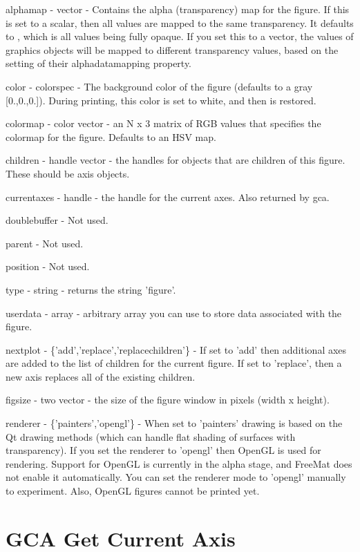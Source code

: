 \begin{DoxyItemize}
\item {\ttfamily alphamap} -\/ {\ttfamily vector} -\/ Contains the alpha (transparency) map for the figure. If this is set to a scalar, then all values are mapped to the same transparency. It defaults to {}, which is all values being fully opaque. If you set this to a vector, the values of graphics objects will be mapped to different transparency values, based on the setting of their {\ttfamily alphadatamapping} property.  
\item {\ttfamily color} -\/ {\ttfamily colorspec} -\/ The background color of the figure (defaults to a gray {\ttfamily \mbox{[}0.,0.,0.\mbox{]}}). During printing, this color is set to white, and then is restored.  
\item {\ttfamily colormap} -\/ {\ttfamily color vector} -\/ an {\ttfamily N x 3} matrix of R\-G\-B values that specifies the colormap for the figure. Defaults to an {\ttfamily H\-S\-V} map.  
\item {\ttfamily children} -\/ {\ttfamily handle vector} -\/ the handles for objects that are children of this figure. These should be axis objects.  
\item {\ttfamily currentaxes} -\/ {\ttfamily handle} -\/ the handle for the current axes. Also returned by {\ttfamily gca}.  
\item {\ttfamily doublebuffer} -\/ Not used.  
\item {\ttfamily parent} -\/ Not used.  
\item {\ttfamily position} -\/ Not used.  
\item {\ttfamily type} -\/ {\ttfamily string} -\/ returns the string {\ttfamily 'figure'}.  
\item {\ttfamily userdata} -\/ {\ttfamily array} -\/ arbitrary array you can use to store data associated with the figure.  
\item {\ttfamily nextplot} -\/ {\ttfamily \{'add','replace','replacechildren'\}} -\/ If set to {\ttfamily 'add'} then additional axes are added to the list of children for the current figure. If set to {\ttfamily 'replace'}, then a new axis replaces all of the existing children.  
\item {\ttfamily figsize} -\/ {\ttfamily two vector} -\/ the size of the figure window in pixels (width x height).  
\item {\ttfamily renderer} -\/ {\ttfamily \{'painters','opengl'\}} -\/ When set to {\ttfamily 'painters'} drawing is based on the Qt drawing methods (which can handle flat shading of surfaces with transparency). If you set the renderer to {\ttfamily 'opengl'} then Open\-G\-L is used for rendering. Support for Open\-G\-L is currently in the alpha stage, and Free\-Mat does not enable it automatically. You can set the renderer mode to {\ttfamily 'opengl'} manually to experiment. Also, Open\-G\-L figures cannot be printed yet.  
\end{DoxyItemize}\hypertarget{handle_gca}{}\section{G\-C\-A Get Current Axis}\label{handle_gca}
